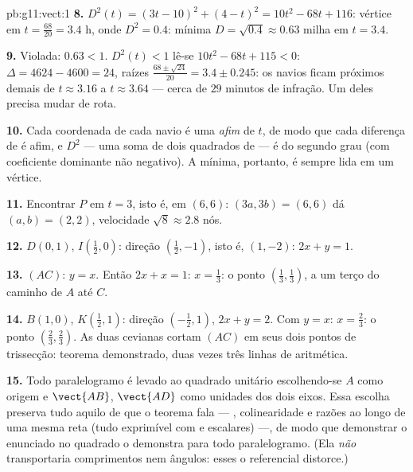 \begin{solution}{pb:g11:vect:1}
\textbf{8.} $D^2(t) = (3t - 10)^2 + (4 - t)^2 =
10t^2 - 68t + 116$: vértice em $t = \frac{68}{20} = 3.4$ h,
onde $D^2 = 0.4$:  mínima
$D = \sqrt{0.4} \approx 0.63$ milha em $t = 3.4$.

\textbf{9.} Violada: $0.63 < 1$. $D^2(t) < 1$ lê-se
$10t^2 - 68t + 115 < 0$: $\Delta = 4624 - 4600 = 24$, raízes
$\frac{68 \pm \sqrt{24}}{20} = 3.4 \pm 0.245$: os navios ficam
próximos demais de $t \approx 3.16$ a $t \approx 3.64$ ---
cerca de $29$ minutos de infração. Um deles precisa mudar de
rota.

\textbf{10.} Cada coordenada de cada navio é uma 
\emph{afim} de $t$, de modo que cada diferença de  é
afim, e $D^2$ --- uma soma de dois quadrados de 
--- é do segundo grau (com coeficiente dominante não negativo).
A  mínima, portanto, é sempre lida em um vértice.

\textbf{11.} Encontrar $P$ em $t = 3$, isto é, em $(6, 6)$:
$(3a, 3b) = (6, 6)$ dá $(a, b) = (2, 2)$, velocidade
$\sqrt{8} \approx 2.8$ nós.

\textbf{12.} $D(0, 1)$, $I\left(\frac12, 0\right)$: direção
$\left(\frac12, -1\right)$, isto é, $(1, -2)$: 
$2x + y = 1$.

\textbf{13.} $(AC)$: $y = x$. Então $2x + x = 1$:
$x = \frac13$: o ponto $\left(\frac13, \frac13\right)$, a um
terço do caminho de $A$ até $C$.

\textbf{14.} $B(1, 0)$, $K\left(\frac12, 1\right)$: direção
$\left(-\frac12, 1\right)$,  $2x + y = 2$. Com $y = x$:
$x = \frac23$: o ponto $\left(\frac23, \frac23\right)$. As duas
cevianas cortam $(AC)$ em seus dois pontos de trissecção:
teorema demonstrado, duas vezes três linhas de aritmética.

\textbf{15.} Todo paralelogramo é levado ao quadrado unitário
escolhendo-se $A$ como origem e $\vect{AB}$, $\vect{AD}$ como
unidades dos dois eixos. Essa escolha preserva tudo aquilo de
que o teorema fala --- , colinearidade e razões ao
longo de uma mesma reta (tudo exprimível com  e
escalares) ---, de modo que demonstrar o enunciado no quadrado o
demonstra para todo paralelogramo. (Ela \emph{não} transportaria
comprimentos nem ângulos: esses o referencial distorce.)


\end{solution}
